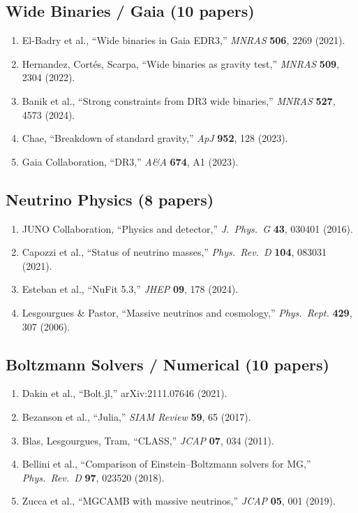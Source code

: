 \documentclass[11pt,a4paper]{article}
\begin{document}
\subsection{Wide Binaries / Gaia (10 papers)}

\begin{enumerate}
\item El-Badry et al., ``Wide binaries in Gaia EDR3,'' \textit{MNRAS} \textbf{506}, 2269 (2021).
\item Hernandez, Cort\'es, Scarpa, ``Wide binaries as gravity test,'' \textit{MNRAS} \textbf{509}, 2304 (2022).
\item Banik et al., ``Strong constraints from DR3 wide binaries,'' \textit{MNRAS} \textbf{527}, 4573 (2024).
\item Chae, ``Breakdown of standard gravity,'' \textit{ApJ} \textbf{952}, 128 (2023).
\item Gaia Collaboration, ``DR3,'' \textit{A\&A} \textbf{674}, A1 (2023).
\end{enumerate}

\subsection{Neutrino Physics (8 papers)}

\begin{enumerate}
\item JUNO Collaboration, ``Physics and detector,'' \textit{J.\ Phys.\ G} \textbf{43}, 030401 (2016).
\item Capozzi et al., ``Status of neutrino masses,'' \textit{Phys.\ Rev.\ D} \textbf{104}, 083031 (2021).
\item Esteban et al., ``NuFit 5.3,'' \textit{JHEP} \textbf{09}, 178 (2024).
\item Lesgourgues \& Pastor, ``Massive neutrinos and cosmology,'' \textit{Phys.\ Rept.} \textbf{429}, 307 (2006).
\end{enumerate}

\subsection{Boltzmann Solvers / Numerical (10 papers)}

\begin{enumerate}
\item Dakin et al., ``Bolt.jl,'' arXiv:2111.07646 (2021).
\item Bezanson et al., ``Julia,'' \textit{SIAM Review} \textbf{59}, 65 (2017).
\item Blas, Lesgourgues, Tram, ``CLASS,'' \textit{JCAP} \textbf{07}, 034 (2011).
\item Bellini et al., ``Comparison of Einstein--Boltzmann solvers for MG,'' \textit{Phys.\ Rev.\ D} \textbf{97}, 023520 (2018).
\item Zucca et al., ``MGCAMB with massive neutrinos,'' \textit{JCAP} \textbf{05}, 001 (2019).
\end{enumerate}
\end{document}
